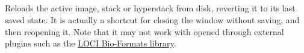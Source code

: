 

\subsection{\protect{}\label{sub:Revert[r]}}

Reloads the active image, stack or hyperstack
from disk, reverting it to its last saved state. It is actually a
shortcut for closing the window without saving, and then reopening
it. Note that it may not work with 
opened through external plugins such as the \href{http://www.loci.wisc.edu/ome/formats.html}{LOCI Bio-Formats library}.




\subsection{\protect{}\label{sub:Page-Setup...}}

